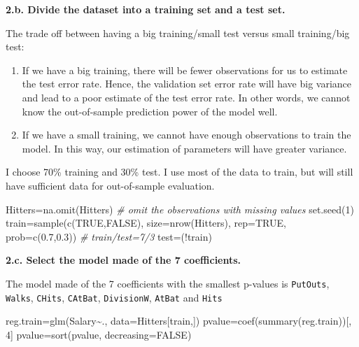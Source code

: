 \documentclass[
]{article}
\newenvironment{Shaded}{\begin{snugshade}}{\end{snugshade}}
\newcommand{\AttributeTok}[1]{\textcolor[rgb]{0.77,0.63,0.00}{#1}}
\newcommand{\CommentTok}[1]{\textcolor[rgb]{0.56,0.35,0.01}{\textit{#1}}}
\newcommand{\ConstantTok}[1]{\textcolor[rgb]{0.00,0.00,0.00}{#1}}
\newcommand{\DecValTok}[1]{\textcolor[rgb]{0.00,0.00,0.81}{#1}}
\newcommand{\FloatTok}[1]{\textcolor[rgb]{0.00,0.00,0.81}{#1}}
\newcommand{\FunctionTok}[1]{\textcolor[rgb]{0.00,0.00,0.00}{#1}}
\newcommand{\NormalTok}[1]{#1}
\newcommand{\OtherTok}[1]{\textcolor[rgb]{0.56,0.35,0.01}{#1}}
\newcommand{\SpecialCharTok}[1]{\textcolor[rgb]{0.00,0.00,0.00}{#1}}
\begin{document}
\textbf{2.b. Divide the dataset into a training set and a test set.}

The trade off between having a big training/small test versus small
training/big test:

\begin{enumerate}
\def\labelenumi{\arabic{enumi})}
\item
  If we have a big training, there will be fewer observations for us to
  estimate the test error rate. Hence, the validation set error rate
  will have big variance and lead to a poor estimate of the test error
  rate. In other words, we cannot know the out-of-sample prediction
  power of the model well.
\item
  If we have a small training, we cannot have enough observations to
  train the model. In this way, our estimation of parameters will have
  greater variance.
\end{enumerate}

I choose 70\% training and 30\% test. I use most of the data to train,
but will still have sufficient data for out-of-sample evaluation.

\begin{Shaded}
\begin{Highlighting}[]
\NormalTok{Hitters}\OtherTok{=}\FunctionTok{na.omit}\NormalTok{(Hitters) }\CommentTok{\# omit the observations with missing values}
\FunctionTok{set.seed}\NormalTok{(}\DecValTok{1}\NormalTok{)}
\NormalTok{train}\OtherTok{=}\FunctionTok{sample}\NormalTok{(}\FunctionTok{c}\NormalTok{(}\ConstantTok{TRUE}\NormalTok{,}\ConstantTok{FALSE}\NormalTok{), }\AttributeTok{size=}\FunctionTok{nrow}\NormalTok{(Hitters), }\AttributeTok{rep=}\ConstantTok{TRUE}\NormalTok{, }\AttributeTok{prob=}\FunctionTok{c}\NormalTok{(}\FloatTok{0.7}\NormalTok{,}\FloatTok{0.3}\NormalTok{)) }\CommentTok{\# train/test=7/3}
\NormalTok{test}\OtherTok{=}\NormalTok{(}\SpecialCharTok{!}\NormalTok{train)}
\end{Highlighting}
\end{Shaded}

\textbf{2.c. Select the model made of the 7 coefficients.}

The model made of the 7 coefficients with the smallest p-values is
\texttt{PutOuts}, \texttt{Walks}, \texttt{CHits}, \texttt{CAtBat},
\texttt{DivisionW}, \texttt{AtBat} and \texttt{Hits}

\begin{Shaded}
\begin{Highlighting}[]
\NormalTok{reg.train}\OtherTok{=}\FunctionTok{glm}\NormalTok{(Salary}\SpecialCharTok{\textasciitilde{}}\NormalTok{., }\AttributeTok{data=}\NormalTok{Hitters[train,])}
\NormalTok{pvalue}\OtherTok{=}\FunctionTok{coef}\NormalTok{(}\FunctionTok{summary}\NormalTok{(reg.train))[, }\DecValTok{4}\NormalTok{]}
\NormalTok{pvalue}\OtherTok{=}\FunctionTok{sort}\NormalTok{(pvalue, }\AttributeTok{decreasing=}\ConstantTok{FALSE}\NormalTok{)}
\end{Highlighting}
\end{Shaded}
\end{document}
